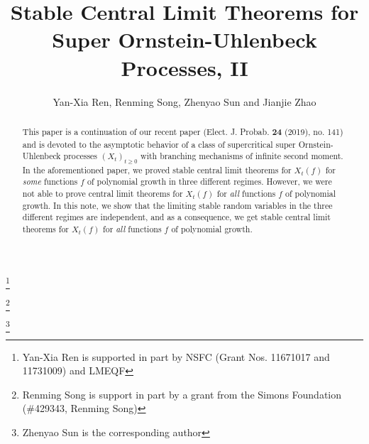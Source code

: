 \documentclass[12pt,a4paper]{amsart}
\theoremstyle{plain}
\theoremstyle{definition}
\numberwithin{equation}{section}
\begin{document}
\title
[stable CLT for super-OU processes, II]
{Stable Central Limit Theorems for Super Ornstein-Uhlenbeck Processes, II}
\author
[Y.-X. Ren, R. Song, Z. Sun and J. Zhao]
{Yan-Xia Ren, Renming Song, Zhenyao Sun and Jianjie Zhao}
\address{
	Yan-Xia Ren \\
	LMAM School of Mathematical Sciences \& Center for Statistical Science \\
  	Peking University \\
  	Beijing 100871, P. R. China}
\thanks{Yan-Xia Ren is supported in part by NSFC (Grant Nos. 11671017  and 11731009) and LMEQF}
\address{
  	Renming Song \\
  	Department of Mathematics \\
  	University of Illinois at Urbana-Champaign \\
  	Urbana, IL 61801, USA}
\thanks{Renming Song is support in part by a grant from the Simons Foundation (\#429343, Renming Song)}
\address{
  	Zhenyao Sun \\
  	Faculty of Industrial Engineering and Management\\
  	Technion, Israel Institute of Technology \\
  	Haifa 3200003, Israel}
\thanks{Zhenyao Sun is the corresponding author}
\address{
  	Jianjie Zhao \\
  	School of Mathematical Sciences \\
  	Peking University \\
  	Beijing 100871, P. R. China}

\begin{abstract}
	This paper is a continuation of our recent paper (Elect. J. Probab. \textbf{24} (2019), no. 141) and is devoted to the asymptotic behavior of a class of supercritical super Ornstein-Uhlenbeck processes $(X_t)_{t\geq 0}$ with branching mechanisms of infinite second moment. In the aforementioned paper, we proved stable central limit theorems for  $X_t(f) $ for {\it some} functions $f$ of polynomial growth in three different regimes. However, we were not able to prove central limit theorems for $X_t(f) $ for {\it all} functions $f$ of polynomial growth.
	In this note, we show that the limiting stable random variables in the three different regimes are independent, and as a consequence, we get stable central limit theorems for  $X_t(f) $ for {\it all} functions $f$ of polynomial growth.
\end{abstract}
\maketitle
\end{document}

